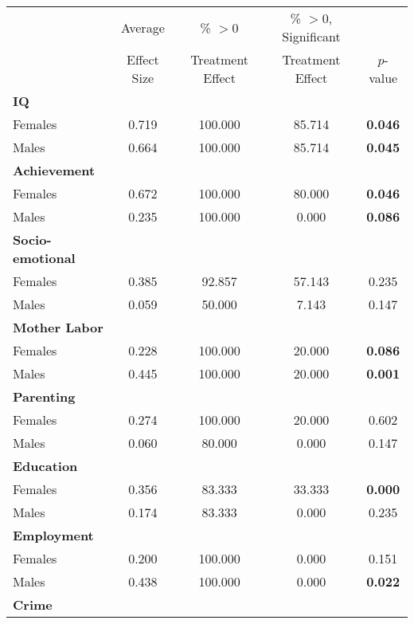 
\begin{tabular}{lcccc}
\toprule
& \footnotesize Average  & \footnotesize \% $>0$ & \footnotesize \% $>0$, Significant & \footnotesize \citet{Rosenbaum_2005_Distribution_JRSS} \\
& \footnotesize Effect Size & \footnotesize Treatment Effect & \footnotesize Treatment Effect & \footnotesize $p$-value \\ 
\midrule
\textbf{IQ}  &  & &  & \\
\quad Females &     0.719 &   100.000 &    85.714 &     \textbf{0.046} \\
\quad Males &     0.664 &   100.000 &    85.714  &     \textbf{0.045}  \\
 \midrule
\textbf{Achievement}  & & & & \\
\quad Females 	&     0.672 &   100.000 &    80.000&     \textbf{0.046} \\
\quad Males 	& 0.235 &   100.000 &     0.000 &     \textbf{0.086} \\  
 \midrule
\textbf{Socio-emotional}  & & & & \\
\quad Females 	&     0.385 &      92.857&    57.143&     0.235 \\
\quad Males 	& 0.059 &  50.000&     7.143 &     0.147 \\
 \midrule
\textbf{Mother Labor}  & & & & \\
\quad Females &     0.228 &   100.000&    20.000 &     \textbf{0.086} \\
\quad Males &     0.445   &   100.000  &    20.000  &     \textbf{0.001} \\  
 \midrule
\textbf{Parenting}   & & & & \\
\quad Females &     0.274 &   100.000 &    20.000 &     0.602 \\
\quad Males &     0.060 &    80.000  &     0.000 & 0.147 \\  
 \midrule
\textbf{Education}  & & & & \\
\quad Females &     0.356 &    83.333 &    33.333 &     \textbf{0.000} \\
\quad Males &     0.174   &    83.333 &     0.000   &     0.235 \\  
 \midrule
\textbf{Employment}   & & & & \\
\quad Females &     0.200 &   100.000 &     0.000 &     0.151 \\
\quad Males &     0.438   &   100.000 &     0.000   &     \textbf{0.022} \\  
 \midrule
\textbf{Crime}   & & & & \\

\end{tabular}

